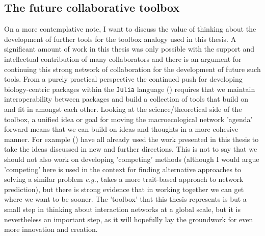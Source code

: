 \begin{refsection}
\subsection{The future collaborative toolbox}

On a more contemplative note, I want to discuss the value of thinking about the development of further tools for the toolbox analogy used in this thesis. A significant amount of work in this thesis was only possible with the support and intellectual contribution of many collaborators and there is an argument for continuing this strong network of collaboration for the development of future such tools. From a purely practical perspective the continued push for developing biology-centric packages within the \texttt{Julia} language (\cite{Roesch2021Julia}) requires that we maintain interoperability between packages and build a collection of tools that build on and fit in amongst each other. Looking at the science/theoretical side of the toolbox, a unified idea or goal for moving the macroecological network 'agenda' forward means that we can build on ideas and thoughts in a more cohesive manner. For example (\cite{Dansereau2023Spatially, Catchen2023Improving, Banville2023What}) have all already used the work presented in this thesis to take the ideas discussed in new and further directions. This is not to say that we should not also work on developing 'competing' methods (although I would argue 'competing' here is used in the context for finding alternative approaches to solving a similar problem \emph{e.g.,} \cite{Caron2022Addressing} takes a more trait-based approach to network prediction), but there is strong evidence that in working together we can get where we want to be sooner. The 'toolbox' that this thesis represents is but a small step in thinking about interaction networks at a global scale, but it is nevertheless an important step, as it will hopefully lay the groundwork for even more innovation and creation.

\printbibliography{}
\end{refsection}

\endinput